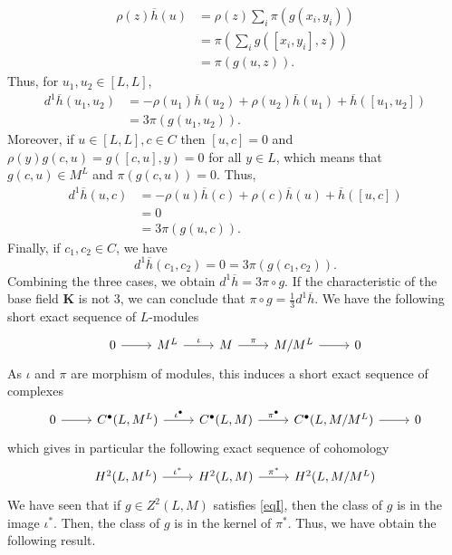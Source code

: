 \documentclass[11pt, twoside]{article}
\begin{document}
\begin{align*}
     \rho(z)\overline{h}(u)&=\rho(z)\sum\limits_i\pi(g(x_i,y_i))\\&=\pi(\sum\limits_ig([x_i,y_i],z))\\&= \pi (g(u,z)).
\end{align*} Thus, for $u_1,u_2\in [L,L]$, \begin{align*}
    d^1\overline{h}(u_1,u_2)&= -\rho(u_1)\overline{h}(u_2)+\rho(u_2)\overline{h}(u_1)+\overline{h}([u_1,u_2])\\ &= 3\pi(g(u_1,u_2)).
\end{align*} Moreover, if $u\in [L,L],c\in C $ then $[u,c]=0 $ and $\rho(y)g(c,u)=g([c,u],y)=0 $ for all $y\in L$, which means that $g(c,u)\in M^L$ and $\pi(g(c,u))=0 $. Thus, \begin{align*}
    d^1\overline{h}(u,c)&= -\rho(u)\overline{h}(c)+\rho(c)\overline{h}(u)+\overline{h}([u,c])\\ &=0\\ &= 3\pi(g(u,c)).
\end{align*}  Finally, if $c_1,c_2\in C $, we have $$d^1\overline{h}(c_1,c_2)=0=3\pi(g(c_1,c_2)). $$ Combining the three cases, we obtain $d^1\overline{h}=3\pi\circ g $. If the characteristic of the base field $\mathbf{K}$ is not $3$, we can conclude that $\pi\circ g=\frac{1}{3}d^1\overline{h} $. We have the following short exact sequence of $L$-modules \[\begin{tikzcd}
	0 & {M^L} & M & {M/M^L} & 0
	\arrow[from=1-1, to=1-2]
	\arrow["\iota", from=1-2, to=1-3]
	\arrow["\pi", from=1-3, to=1-4]
	\arrow[from=1-4, to=1-5]
\end{tikzcd}\] As $\iota $ and $\pi$ are morphism of modules, this induces a short exact sequence of complexes \[\begin{tikzcd}
	0 & {C^\bullet (L,M^L)} & {C^\bullet(L,M)} & {C^\bullet(L,M/M^L)} & 0
	\arrow[from=1-1, to=1-2]
	\arrow["{\iota^\bullet}", from=1-2, to=1-3]
	\arrow["{\pi^\bullet}", from=1-3, to=1-4]
	\arrow[from=1-4, to=1-5]
\end{tikzcd}\] which gives in particular the following exact sequence of cohomology \[\begin{tikzcd}
	 {H^2(L,M^L)} & {H^2(L,M)} & {H^2(L,M/M^L)} 
	\arrow["{\iota^*}", from=1-1, to=1-2]
	\arrow["{\pi^*}", from=1-2, to=1-3]
\end{tikzcd}\] We have seen that if $g\in Z^2(L,M)$ satisfies \eqref{eqI}, then the class of $g $ is in the image $\iota^*$. Then, the class of $g $ is in the kernel of $\pi^* $. Thus, we have obtain the following result.
\end{document}
